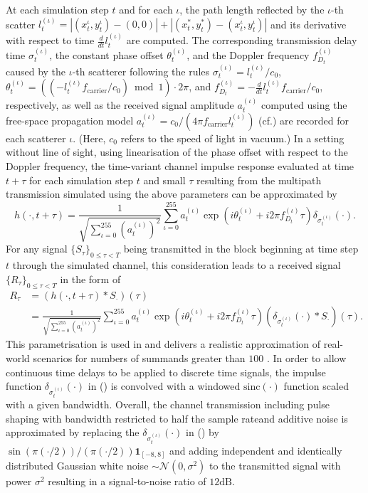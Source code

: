 \documentclass[a4paper,extrafontsizes,article]{memoir}
\begin{document}
At each simulation step $t$ and for each $\iota$, the path length reflected by the $\iota$-th scatter $l^{(\iota)}_t =\left\vert(x_t^\iota,y_t^\iota)-(0,0)\right\vert + \left\vert(x_t^*,y_t^*)-(x_t^\iota,y_t^\iota)\right\vert$ and its derivative with respect to time $\frac{d}{dt}l_t^{(\iota)}$ are computed. The corresponding transmission delay time $\sigma_t^{(\iota)}$, the constant phase offset $\theta_t^{(\iota)}$,  and the Doppler frequency $f_{D_t}^{(\iota)}$ caused by the $\iota$-th scatterer following the rules $\sigma_t^{(\iota)}=l_t^{(\iota)}/c_0$, $\theta_t^{(\iota)}=((-l_t^{(\iota)}f_{\text{carrier}}/c_0) \bmod 1)\cdot 2\pi$, and $f_{D_t}^{(\iota)}=-\frac{d}{dt}l_t^{(\iota)}f_{\text{carrier}}/{c_0}$, respectively, as well as the received signal amplitude $a_t^{(\iota)}$ computed using the free-space propagation model   $a_t^{(\iota)}=c_0/(4\pi f_{\text{carrier}} l_t^{(\iota)})$ (cf.) are recorded for each scatterer $\iota$. (Here, $c_0$ refers to the speed of light in vacuum.)
In a setting without line of sight, using linearisation of the phase offset with respect to the Doppler frequency, the time-variant channel impulse response evaluated at time $t+\tau$ for each simulation step $t$ and small $\tau$ resulting from the multipath transmission simulated using the above parameters can be approximated by
\[
h(\cdot,t+\tau)=\frac{1}{\sqrt{\sum_{\iota=0}^{255} (a_t^{(\iota)}) ^2}}\sum_{\iota=0}^{255} a_t^{(\iota)}\exp(i\theta_t^{(\iota)}+i2\pi f_{D_t}^{(\iota)}\tau)\delta_{\sigma_t^{(\iota)}}(\cdot).
\]
For any signal $\{S_\tau\}_{0\leq\tau< T}$ being transmitted in the block beginning at time step $t$ through the simulated channel, this consideration leads to a received signal $\{R_\tau\}_{0\leq\tau< T}$ in the form of
\begin{align}
\nonumber R_\tau &= (h(\cdot,t+\tau) *S_\cdot)(\tau)\\
& = \frac{1}{\sqrt{\sum_{\iota=0}^{255} (a_t^{(\iota)}) ^2}}\sum_{\iota=0}^{255} a_t^{(\iota)}\exp(i\theta_t^{(\iota)}+i2\pi f_{D_t}^{(\iota)}\tau)(\delta_{\sigma_t^{(\iota)}}(\cdot)*S_\cdot)(\tau).
\end{align}
This parametrisation is used in  and delivers a realistic approximation of real-world scenarios for numbers of summands greater than $100$ . In order to allow continuous time delays to be applied to discrete time signals, the impulse function $\delta_{\sigma_t^{(\iota)}}(\cdot)$ in () is convolved with a windowed $\text{sinc}(\cdot)$ function scaled with a given bandwidth.  Overall, the channel transmission including pulse shaping with bandwidth restricted to half the sample rate\linebreak and additive noise is approximated by replacing the $\delta_{\sigma_t^{(\iota)}}(\cdot)$ in () by\linebreak $\sin(\pi(\cdot/2))/(\pi(\cdot/2))\mathbf{1}_{[-8,8]}$ and adding independent and identically distributed Gaussian white noise $\sim\mathcal{N}(0,\sigma^2)$ to the transmitted signal with power $\sigma^2$ resulting in a signal-to-noise ratio of $12\text{dB}$.
\end{document}

